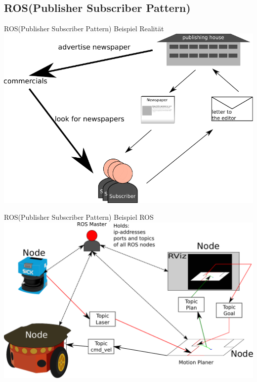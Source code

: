 \documentclass{VLKlauck}
\begin{document}
	\subsection{ROS(Publisher Subscriber Pattern)}
	\begin{frame}{ROS(Publisher Subscriber Pattern)}
		\centering
			Beispiel Realität\\					   
			\includegraphics[scale=0.5]{PS_Newspaper.pdf}
	\end{frame}
	
 	\begin{frame}{ROS(Publisher Subscriber Pattern)}
		\centering
		Beispiel ROS\\			   
		\includegraphics[scale=0.5]{PS_ROS.pdf}
	\end{frame}
	
\end{document}

